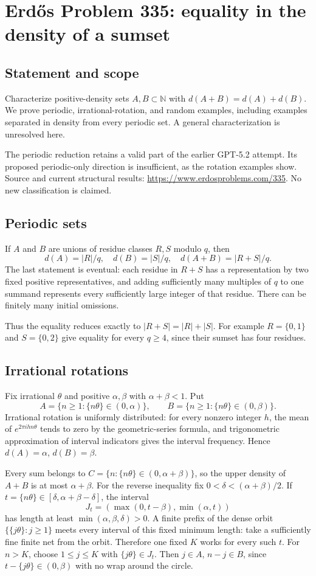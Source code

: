 \section*{Erd\H{o}s Problem 335: equality in the density of a sumset}
\subsection*{Statement and scope}
Characterize positive-density sets $A,B\subset\mathbb N$ with
$d(A+B)=d(A)+d(B)$. We prove periodic, irrational-rotation, and random examples, including examples separated in density from every periodic set. A general characterization is unresolved here.

The periodic reduction retains a valid part of the earlier GPT-5.2 attempt. Its proposed periodic-only direction is insufficient, as the rotation examples show. Source and current structural results: \url{https://www.erdosproblems.com/335}. No new classification is claimed.

\subsection*{Periodic sets}
If $A$ and $B$ are unions of residue classes $R,S$ modulo $q$, then
\[
 d(A)=|R|/q,\quad d(B)=|S|/q,\quad d(A+B)=|R+S|/q.
\]
The last statement is eventual: each residue in $R+S$ has a representation by two fixed positive representatives, and adding sufficiently many multiples of $q$ to one summand represents every sufficiently large integer of that residue. There can be finitely many initial omissions.

Thus the equality reduces exactly to $|R+S|=|R|+|S|$. For example $R=\{0,1\}$ and $S=\{0,2\}$ give equality for every $q\ge4$, since their sumset has four residues.

\subsection*{Irrational rotations}
Fix irrational $\theta$ and positive $\alpha,\beta$ with $\alpha+\beta<1$. Put
\[
 A=\{n\ge1:\{n\theta\}\in(0,\alpha)\},\qquad
 B=\{n\ge1:\{n\theta\}\in(0,\beta)\}.
\]
Irrational rotation is uniformly distributed: for every nonzero integer $h$, the mean of $e^{2\pi i h n\theta}$ tends to zero by the geometric-series formula, and trigonometric approximation of interval indicators gives the interval frequency. Hence $d(A)=\alpha$, $d(B)=\beta$.

Every sum belongs to $C=\{n:\{n\theta\}\in(0,\alpha+\beta)\}$, so the upper density of $A+B$ is at most $\alpha+\beta$. For the reverse inequality fix $0<\delta<(\alpha+\beta)/2$. If
$t=\{n\theta\}\in[\delta,\alpha+\beta-\delta]$, the interval
\[
 J_t=(\max(0,t-\beta),\min(\alpha,t))
\]
has length at least $\min(\alpha,\beta,\delta)>0$. A finite prefix of the dense orbit $\{\{j\theta\}:j\ge1\}$ meets every interval of this fixed minimum length: take a sufficiently fine finite net from the orbit. Therefore one fixed $K$ works for every such $t$. For $n>K$, choose $1\le j\le K$ with $\{j\theta\}\in J_t$. Then $j\in A$, $n-j\in B$, since $t-\{j\theta\}\in(0,\beta)$ with no wrap around the circle.

